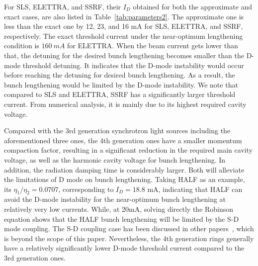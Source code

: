 \documentclass[%
 reprint,
 amsmath,amssymb,
 aps,
]{revtex4-1}
\begin{document}
For SLS, ELETTRA, and SSRF, their $I_D$ obtained for both the approximate and exact cases, are also listed in Table~\ref{tab:parameters2}. The approximate one is less than the exact one by 12, 23, and 16 mA for SLS, ELETTRA, and SSRF, respectively. The exact threshold current under the near-optimum lengthening condition is $\SI{160}{mA}$ for ELETTRA.  When the beam current gets lower than that, the detuning for the desired bunch lengthening becomes smaller than the D-mode threshold detuning. It indicates that the D-mode instability would occur before reaching the detuning for desired bunch lengthening. As a result, the bunch lengthening would be limited by the D-mode instability. We note that compared to SLS and ELETTRA, SSRF has a significantly larger threshold current. From numerical analysis, it is mainly due to its highest required cavity voltage. 

Compared with the 3rd generation synchrotron light sources including the aforementioned three ones, the 4th generation ones have a smaller momentum compaction factor, resulting in a significant reduction in the required main cavity voltage, as well as the harmonic cavity voltage for bunch lengthening. In addition, the radiation damping time is considerably larger. Both will alleviate the limitations of D mode on bunch lengthening. Taking HALF as an example, its $\eta_1/\eta_2 =0.0707$, corresponding to $I_D=18.8$ mA, indicating that HALF can avoid the D-mode instability for the near-optimum bunch lengthening at relatively very low currents. While, at 20mA, solving directly the Robinson equation shows that the HALF bunch lengthening will be limited by the S-D mode coupling. The S-D coupling case has been discussed in other papers~\cite{He06, Gamelin18}, which is beyond the scope of this paper. Nevertheless, the 4th generation rings generally have a relatively significantly lower D-mode threshold current compared to the 3rd generation ones.
\end{document}
